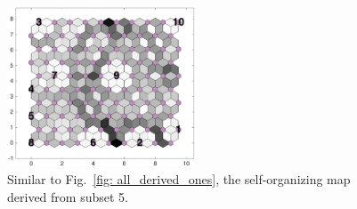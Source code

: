 \begin{figure}
        \centering
        \includegraphics[width=0.5\textwidth]{../../images0.01/M31/2D/image_subsets/subset3_dist_with_hits_t.png}
    \caption{Similar to Fig.~\ref{fig: all_derived_ones}, the self-organizing map derived from subset 5.}
    \label{fig: subset3}
\end{figure}
